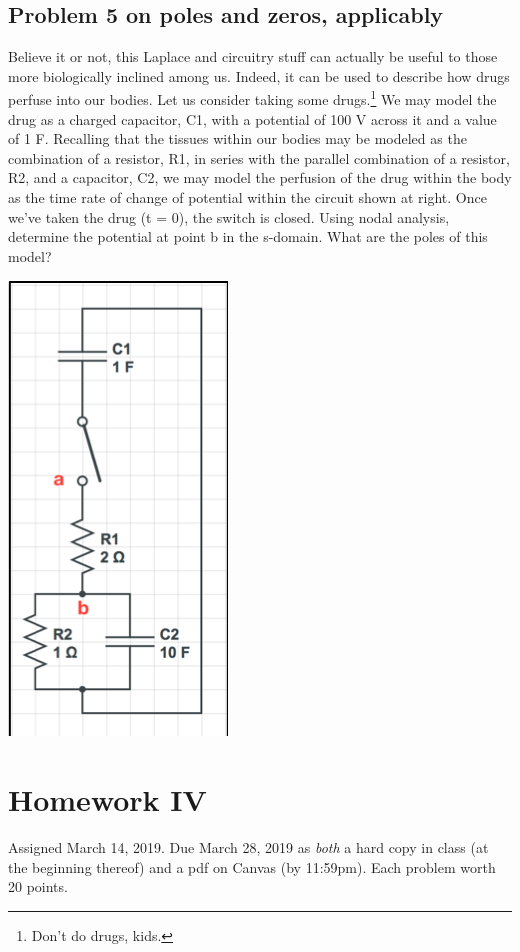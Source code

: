 \documentclass[11pt]{book}
\begin{document}
\section{Problem 5 on poles and zeros, applicably}
Believe it or not, this Laplace and circuitry stuff can actually be useful to those more biologically inclined among us. Indeed, it can be used to describe how drugs perfuse into our bodies. Let us consider taking some drugs.\footnote{Don't do drugs, kids.}  We may model the drug as a charged capacitor, C1, with a potential of 100 V across it and a value of 1 F. Recalling that the tissues within our bodies may be modeled as the combination of a resistor, R1, in series with the parallel combination of a resistor, R2, and a capacitor, C2, we may model the perfusion of the drug within the body as the time rate of change of potential within the circuit shown at right. Once we’ve taken the drug (t = 0), the switch is closed. Using nodal analysis, determine the potential at point b in the s-domain. What are the poles of this model? 
\begin{center}
	\includegraphics{figures/hw3.02.png}
\end{center}

\chapter*{Homework IV}
Assigned March 14, 2019. Due March 28, 2019 as \textit{both} a hard copy in class (at the beginning thereof) and a pdf on Canvas (by 11:59pm). Each problem worth 20 points.
\setcounter{chapter}{4}
\setcounter{section}{0}
\end{document}

